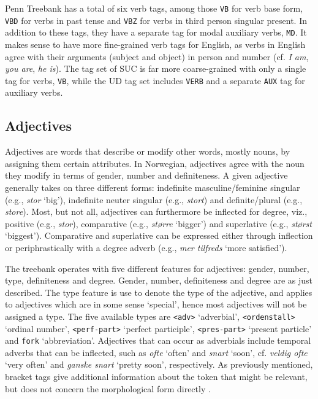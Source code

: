 \documentclass[a4paper,12pt,english]{book}
\begin{document}
Penn Treebank has a total of six verb tags, among those \texttt{VB} for verb
base form, \texttt{VBD} for verbs in past tense and \texttt{VBZ} for verbs in
third person singular present. In addition to these tags, they have a separate
tag for modal auxiliary verbs, \texttt{MD}. It makes sense to have more
fine-grained verb tags for English, as verbs in English agree with their
arguments (subject and object) in person and number (cf.  \emph{I am},
\emph{you are}, \emph{he is}). The tag set of SUC is far more coarse-grained
with only a single tag for verbs, \texttt{VB}, while the UD tag set includes
\texttt{VERB} and a separate \texttt{AUX} tag for auxiliary verbs.


\subsection{Adjectives}
\label{subsec:adj}
Adjectives are words that describe or modify other words, mostly nouns, by
assigning them certain attributes. In Norwegian, adjectives agree with the
noun they modify in terms of gender, number and definiteness. A given adjective
generally takes on three different forms: indefinite masculine/feminine
singular (e.g., \emph{stor} `big'), indefinite neuter singular (e.g.,
\emph{stort}) and definite/plural (e.g., \emph{store}). Most, but not all,
adjectives can furthermore be inflected for degree, viz., positive (e.g.,
\emph{stor}), comparative (e.g., \emph{større} `bigger') and superlative (e.g.,
\emph{størst} `biggest').  Comparative and superlative can be expressed either
through inflection or periphrastically with a degree adverb (e.g., \emph{mer
    tilfreds} `more satisfied').

The treebank operates with five different features for adjectives: gender,
number, type, definiteness and degree. Gender, number, definiteness and degree
are as just described. The type feature is use to denote the type of
the adjective, and applies to adjectives which are in some sense `special',
hence most adjectives will not be assigned a type. The five available types are
\texttt{<adv>} `adverbial', \texttt{<ordenstall>} `ordinal number',
\texttt{<perf-part>} `perfect participle', \texttt{<pres-part>} `present
particle' and \texttt{fork} `abbreviation'. Adjectives that can occur as
adverbials include temporal adverbs that can be inflected, such as \emph{ofte}
`often' and \emph{snart} `soon', cf.  \emph{veldig ofte} `very often' and
\emph{ganske snart} `pretty soon', respectively. As previously mentioned,
bracket tags give additional information about the token that might be
relevant, but does not concern the morphological form directly
\cite{Kin:Sol:Eri:13}.
\end{document}

